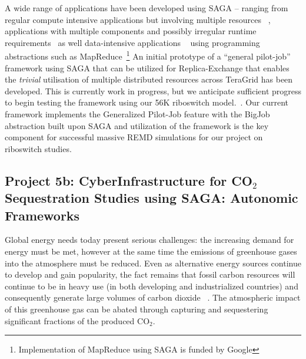 \documentclass[a4paper,10pt]{article}
\begin{document}
A wide range of applications have been developed using SAGA -- ranging from regular compute 
intensive applications but involving multiple resources ~\cite{saga_escience07, gmac, REMD-
PhilTranA2009}, applications with multiple components and possibly irregular runtime 
requirements~\cite{saga_loosely_coupled, teragrid08} as well data-intensive applications 
~\cite{saga_data_intensive, saga_grid_cloud} using programming abstractions such as 
MapReduce~\footnote{Implementation of MapReduce using SAGA is funded by Google} An initial 
prototype of a ``general pilot-job'' framework using SAGA that can be utilized for Replica-Exchange 
that enables the {\it trivial} utilisation of multiple distributed resources across TeraGrid has 
been developed. This is currently work in progress, but we anticipate sufficient progress to begin 
testing the framework using our 56K riboswitch model.~\cite{REMD-PhilTranA2009}. %
Our current framework implements the Generalized Pilot-Job feature with the BigJob abstraction 
built upon SAGA and utilization of the framework is the key component for successful massive REMD 
simulations for our project on riboswitch studies.


\subsection*{Project 5b: CyberInfrastructure for CO$_2$ Sequestration Studies using SAGA: Autonomic Frameworks}

Global energy needs today present serious challenges: the increasing demand for energy must be met, 
however at the same time the emissions of greenhouse gases into the atmosphere must be reduced. 
Even as alternative energy sources continue to develop and gain popularity, the fact remains that 
fossil carbon resources will continue to be in heavy use (in both developing and industrialized 
countries) and consequently generate large volumes of carbon dioxide ~\cite{GeoRPT,Pawar}. The 
atmospheric impact of this greenhouse gas can be abated through capturing and sequestering 
significant fractions of the produced CO$_2$.
\end{document}
